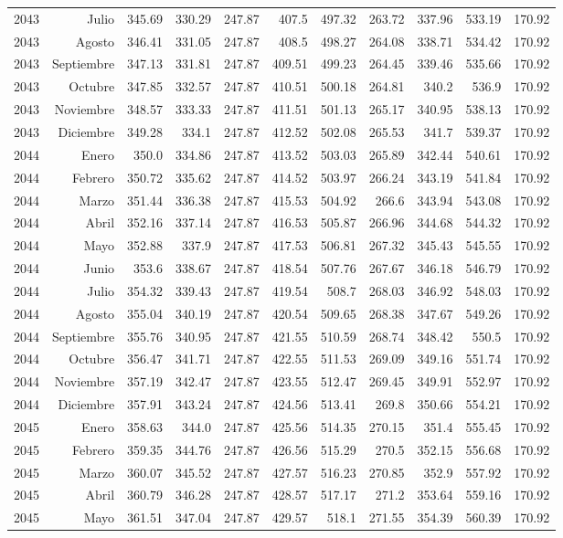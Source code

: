 \documentclass{article}%
\begin{document}
\begin{longtable}{|l r|r|r|r|r|r|r|r|r|r|}
2043&Julio&345.69&330.29&247.87&407.5&497.32&263.72&337.96&533.19&170.92\\%
2043&Agosto&346.41&331.05&247.87&408.5&498.27&264.08&338.71&534.42&170.92\\%
2043&Septiembre&347.13&331.81&247.87&409.51&499.23&264.45&339.46&535.66&170.92\\%
2043&Octubre&347.85&332.57&247.87&410.51&500.18&264.81&340.2&536.9&170.92\\%
2043&Noviembre&348.57&333.33&247.87&411.51&501.13&265.17&340.95&538.13&170.92\\%
2043&Diciembre&349.28&334.1&247.87&412.52&502.08&265.53&341.7&539.37&170.92\\%
2044&Enero&350.0&334.86&247.87&413.52&503.03&265.89&342.44&540.61&170.92\\%
2044&Febrero&350.72&335.62&247.87&414.52&503.97&266.24&343.19&541.84&170.92\\%
2044&Marzo&351.44&336.38&247.87&415.53&504.92&266.6&343.94&543.08&170.92\\%
2044&Abril&352.16&337.14&247.87&416.53&505.87&266.96&344.68&544.32&170.92\\%
2044&Mayo&352.88&337.9&247.87&417.53&506.81&267.32&345.43&545.55&170.92\\%
2044&Junio&353.6&338.67&247.87&418.54&507.76&267.67&346.18&546.79&170.92\\%
2044&Julio&354.32&339.43&247.87&419.54&508.7&268.03&346.92&548.03&170.92\\%
2044&Agosto&355.04&340.19&247.87&420.54&509.65&268.38&347.67&549.26&170.92\\%
2044&Septiembre&355.76&340.95&247.87&421.55&510.59&268.74&348.42&550.5&170.92\\%
2044&Octubre&356.47&341.71&247.87&422.55&511.53&269.09&349.16&551.74&170.92\\%
2044&Noviembre&357.19&342.47&247.87&423.55&512.47&269.45&349.91&552.97&170.92\\%
2044&Diciembre&357.91&343.24&247.87&424.56&513.41&269.8&350.66&554.21&170.92\\%
2045&Enero&358.63&344.0&247.87&425.56&514.35&270.15&351.4&555.45&170.92\\%
2045&Febrero&359.35&344.76&247.87&426.56&515.29&270.5&352.15&556.68&170.92\\%
2045&Marzo&360.07&345.52&247.87&427.57&516.23&270.85&352.9&557.92&170.92\\%
2045&Abril&360.79&346.28&247.87&428.57&517.17&271.2&353.64&559.16&170.92\\%
2045&Mayo&361.51&347.04&247.87&429.57&518.1&271.55&354.39&560.39&170.92\\%

\end{longtable}
\end{document}
